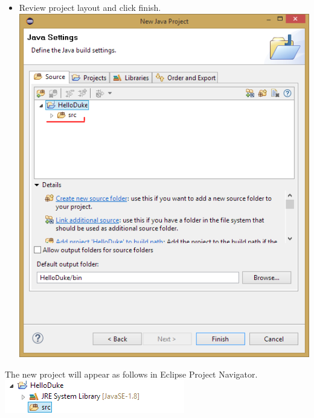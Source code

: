 \documentclass[10pt,landscape]{article}
\begin{document}
\begin{multicols}{2}
\begin{multicols}{2}
\begin{itemize}
\item Review project layout and click finish. \includegraphics[width=1\linewidth]{../slides/EclipseProjectWizard2.png}
\end{itemize}
The new project will appear as follows in Eclipse Project Navigator.
\includegraphics[width=1\linewidth]{../slides/EclipseProjectExplorerNewProject1.png}
\end{multicols}

\end{multicols}
\end{document}
